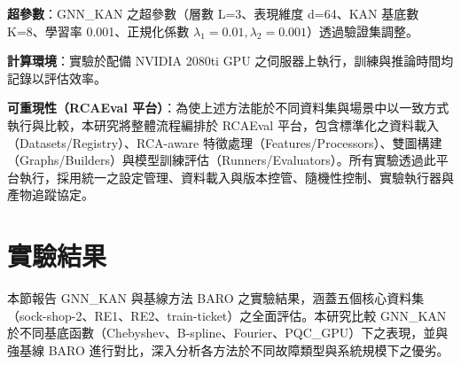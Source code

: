 \documentclass[10pt,a4paper,twocolumn]{article}
\begin{document}
\textbf{超參數}：GNN\_KAN 之超參數（層數 L=3、表現維度 d=64、KAN 基底數 K=8、學習率 0.001、正規化係數 $\lambda_1=0.01, \lambda_2=0.001$）透過驗證集調整。

\textbf{計算環境}：實驗於配備 NVIDIA 2080ti GPU 之伺服器上執行，訓練與推論時間均記錄以評估效率。

\textbf{可重現性（RCAEval 平台）}：為使上述方法能於不同資料集與場景中以一致方式執行與比較，本研究將整體流程編排於 RCAEval 平台，包含標準化之資料載入（Datasets/Registry）、RCA-aware 特徵處理（Features/Processors）、雙圖構建（Graphs/Builders）與模型訓練評估（Runners/Evaluators）。所有實驗透過此平台執行，採用統一之設定管理、資料載入與版本控管、隨機性控制、實驗執行器與產物追蹤協定。

\section{實驗結果}

本節報告 GNN\_KAN 與基線方法 BARO 之實驗結果，涵蓋五個核心資料集（sock-shop-2、RE1、RE2、train-ticket）之全面評估。本研究比較 GNN\_KAN 於不同基底函數（Chebyshev、B-spline、Fourier、PQC\_GPU）下之表現，並與強基線 BARO 進行對比，深入分析各方法於不同故障類型與系統規模下之優劣。
\end{document}
